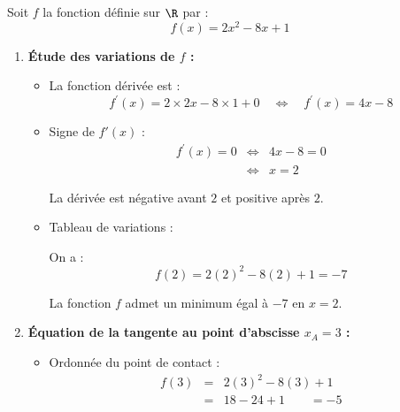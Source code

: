 \begin{ex}
	Soit $f$ la fonction définie sur $\R$ par :
	\[
		f(x) = 2x^2 - 8x + 1
	\]

	\begin{enumerate}
		\item \textbf{Étude des variations de $f$ :}
		      \begin{itemize}
			      \item La fonction dérivée est :
			            \[
				            f^\prime(x) = 2 \times 2x - 8\times 1 + 0\quad\iff\quad f^\prime(x) = 4x - 8
			            \]
			      \item Signe de $f'(x)$ :
			            \[
				            \begin{array}{rcl}
					            f^\prime(x) = 0 & \iff & 4x - 8 = 0 \\
					                            & \iff & x = 2
				            \end{array}
			            \]

			            La dérivée est négative avant $2$ et positive après $2$.

			      \item Tableau de variations :
			            \begin{center}
			            \end{center}

			            On a :
			            \[
				            f(2) = 2(2)^2 - 8(2) + 1 = -7
			            \]

			            La fonction $f$ admet un minimum égal à $-7$ en $x = 2$.
		      \end{itemize}

		\item \textbf{Équation de la tangente au point d'abscisse $x_A = 3$ :}
		      \begin{itemize}
			      \item Ordonnée du point de contact :
			            \[
				            \begin{array}{rcl}
					            f(3) & = & 2(3)^2 - 8(3) + 1       \\
					                 & = & 18 - 24 + 1 \qquad = -5
				            \end{array}
			            \]


\end{itemize}
\end{enumerate}
\end{ex}
